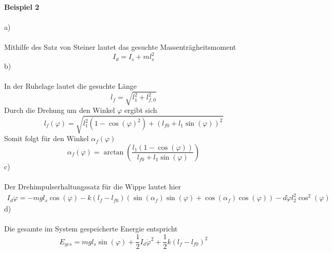 \textbf{Beispiel 2}\\ \\
a)\\ \\
Mithilfe des Satz von Steiner lautet das gesuchte Massenträgheitsmoment
\[
	I_d = I_s + ml_s^2
\]
b)\\ \\
In der Ruhelage lautet die gesuchte Länge
\[
	l_f = \sqrt{l_1^2 + l_{f,0}^2}
\]
Durch die Drehung um den Winkel $\varphi$ ergibt sich
\[
	l_f(\varphi) = \sqrt{l_1^2(1 - \cos(\varphi)^2) + (l_{f0} + l_1\sin(\varphi))^2}
\]
\newpage
\noindent
Somit folgt für den Winkel $\alpha_f(\varphi)$
\[
	\alpha_f(\varphi) = \arctan\left(\frac{l_1(1 - \cos(\varphi))}{l_{f0} + l_1\sin(\varphi)}\right)
\]
c)\\ \\
Der Drehimpulserhaltungssatz für die Wippe lautet hier
\begin{align*}
	I_d\ddot{\varphi} = - mgl_s\cos(\varphi) - k(l_f - l_{f0})(\sin(\alpha_f)\sin(\varphi) + \cos(\alpha_f)\cos(\varphi)) - d\dot{\varphi}l_2^2\cos^2(\varphi)
\end{align*}
d)\\ \\
Die gesamte im System gespeicherte Energie entspricht
\[
	E_{ges} = mgl_s\sin(\varphi) + \frac{1}{2}I_d\dot{\varphi}^2 + \frac{1}{2}k(l_f - l_{f0})^2
\]
